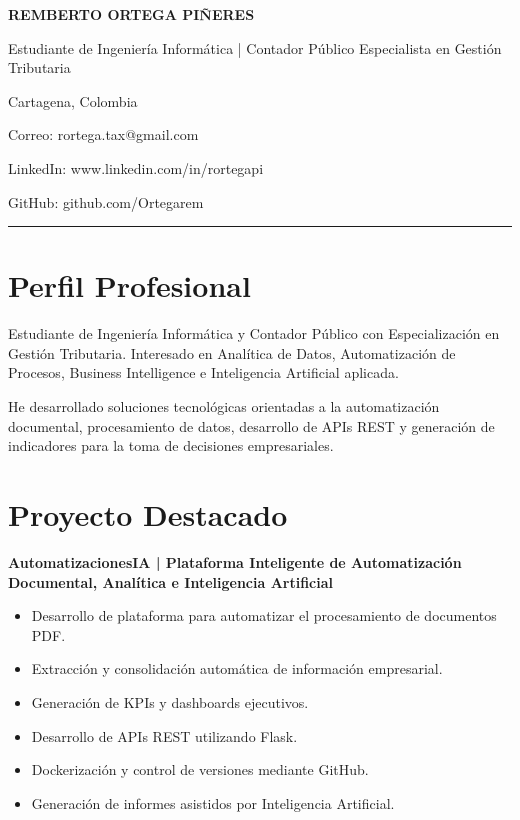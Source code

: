 \documentclass[11pt,a4paper]{article}
\begin{document}
\begin{center}
{\LARGE \textbf{REMBERTO ORTEGA PIÑERES}}

\vspace{0.2cm}

Estudiante de Ingeniería Informática | Contador Público Especialista en Gestión Tributaria

\vspace{0.2cm}

Cartagena, Colombia

Correo: rortega.tax@gmail.com

LinkedIn: www.linkedin.com/in/rortegapi

GitHub: github.com/Ortegarem
\end{center}

\hrule

\vspace{0.4cm}

\section*{Perfil Profesional}

Estudiante de Ingeniería Informática y Contador Público con Especialización en Gestión Tributaria. Interesado en Analítica de Datos, Automatización de Procesos, Business Intelligence e Inteligencia Artificial aplicada.

He desarrollado soluciones tecnológicas orientadas a la automatización documental, procesamiento de datos, desarrollo de APIs REST y generación de indicadores para la toma de decisiones empresariales.

\section*{Proyecto Destacado}

\textbf{AutomatizacionesIA | Plataforma Inteligente de Automatización Documental, Analítica e Inteligencia Artificial}

\begin{itemize}[leftmargin=*]
\item Desarrollo de plataforma para automatizar el procesamiento de documentos PDF.
\item Extracción y consolidación automática de información empresarial.
\item Generación de KPIs y dashboards ejecutivos.
\item Desarrollo de APIs REST utilizando Flask.
\item Dockerización y control de versiones mediante GitHub.
\item Generación de informes asistidos por Inteligencia Artificial.
\end{itemize}
\end{document}
